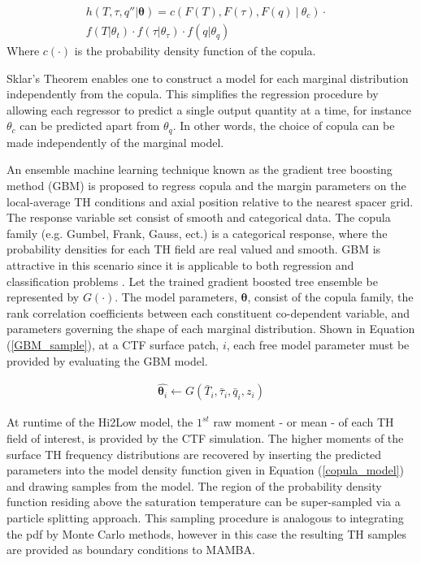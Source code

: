 \documentclass{anstrans}
\begin{document}
\begin{eqnarray}
 h(T, \tau, q''|\bm \theta) = c(F(T), F(\tau), F(q)\ |\ \theta_c) \cdot & \nonumber \\
f(T|\theta_t) \cdot f(\tau|\theta_{\tau}) \cdot f(q|\theta_q)
\label{copula_model}
\end{eqnarray}
Where $c(\cdot)$ is the probability density function of the copula. 

Sklar's Theorem enables one to construct a model for each marginal distribution independently from the copula.  This simplifies the regression procedure by allowing each regressor to predict a single output quantity at a time, for instance $\theta_c$ can be predicted apart from $\theta_q$.  In other words, the choice of copula can be made independently of the marginal model.

An ensemble machine learning technique known as the gradient tree boosting method
 (GBM) is proposed to regress copula and the margin parameters on the
local-average TH conditions and axial position relative to the nearest spacer grid.  The
response variable set consist of smooth and categorical data.  The copula
family (e.g. Gumbel, Frank, Gauss, ect.) is a categorical response, where the probability
densities for each TH field are real valued and smooth.  GBM is attractive in this scenario since
it is applicable to both regression and
classification problems \cite{friedman2002}. Let the trained gradient boosted tree ensemble be represented by $G(\cdot)$. 
The model parameters, $\bm \theta$, consist of the copula family, the rank correlation coefficients between each constituent co-dependent variable, and parameters governing the shape of each marginal distribution.  Shown in Equation (\ref{GBM_sample}), at a CTF surface patch, $i$, each free model parameter must be provided by evaluating the GBM model.

\begin{eqnarray}
\hat {\bm \theta_i} \leftarrow G(\bar T_i, \bar \tau_i, \bar q_i, z_i) 
\label{GBM_sample}
\end{eqnarray}

At runtime of the Hi2Low model, the $1^{st}$ raw moment - or mean - of each TH field of interest, is provided by the CTF simulation.  The higher moments of the surface TH frequency distributions  are recovered by inserting the predicted parameters into the model density function given in Equation (\ref{copula_model}) and drawing samples from the model.  The region of the probability density function residing above the saturation temperature can be super-sampled via a particle splitting approach.  This sampling procedure is analogous to integrating the pdf by Monte Carlo methods, however in this case the resulting TH samples are provided as boundary conditions to MAMBA.
\end{document}
